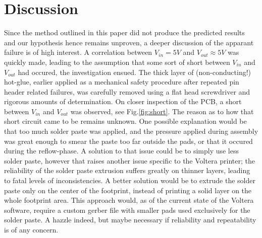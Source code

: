 \section{Discussion}
Since the method outlined in this paper did not produce the predicted results and our hypothesis hence remains unproven, a deeper discussion of the apparant failure is of high interest. A correlation between $V_{in} = 5V$ and $V_{out} \approx 5V$ was quickly made, leading to the assumption that some sort of short between $V_{in}$ and $V_{out}$ had occured, the investigation ensued. The thick layer of (non-conducting!) hot-glue, earlier applied as a mechanical safety procedure after repeated pin header related failures, was carefully removed using a flat head screwdriver and rigorous amounts of determination. On closer inspection of the PCB, a short between $V_{in}$ and $V_{out}$ was observed, see Fig.\ref{fig:short}. The reason as to how that short circuit came to be remains unknown. One possible explanation would be that too much solder paste was applied, and the pressure applied during assembly was great enough to smear the paste too far outside the pads, or that it occured during the reflow-phase. A solution to that issue could be to simply use less solder paste, however that raises another issue specific to the Voltera printer; the reliability of the solder paste extrusion suffers greatly on thinner layers, leading to fatal levels of inconsistencies. A better solution would be to extrude the solder paste only on the center of the footprint, instead of printing a solid layer on the whole footprint area. This approach would, as of the current state of the Voltera software, require a custom gerber file with smaller pads used exclusively for the solder paste. A hazzle indeed, but maybe necessary if reliability and repeatability is of any concern.

